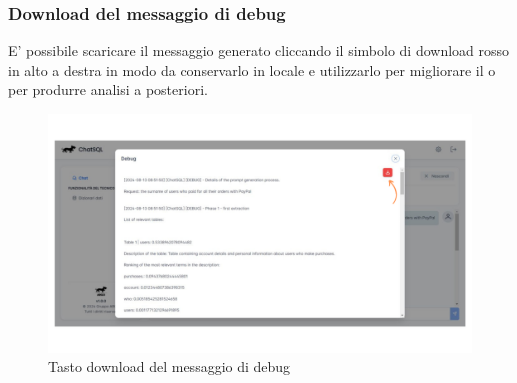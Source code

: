 \subsubsection{Download del messaggio di debug}

E' possibile scaricare il messaggio generato cliccando il simbolo di download rosso in alto a destra in modo da conservarlo in locale e utilizzarlo per migliorare il  o per produrre analisi a posteriori.
\begin{figure}[H]
  \centering
  \includegraphics[width=1\textwidth]{assets/tasto_dawnload_debug.png}
  \caption{Tasto download del messaggio di debug}
\end{figure}





